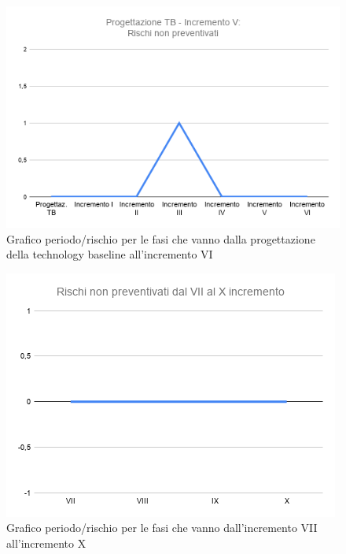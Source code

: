	\begin{figure}[H]
			\centering
			\includegraphics[width=0.8\linewidth]{./res/images/RischiNonPrevent_3.png}
			\caption{Grafico periodo/rischio per le fasi che vanno dalla progettazione della technology baseline all'incremento VI}
			\label{fig:Grafico periodo/rischio per le fasi che vanno dalla progettazione della technology baseline all'incremento VI}
	\end{figure}

	\begin{figure}[H]
			\centering
			\includegraphics[width=0.8\linewidth]{./res/images/RischiNonPrevent_4.png}
			\caption{Grafico periodo/rischio per le fasi che vanno dall'incremento VII all'incremento X}
			\label{fig:Grafico periodo/rischio per le fasi che vanno dall'incremento VII all'incremento X}
	\end{figure}

